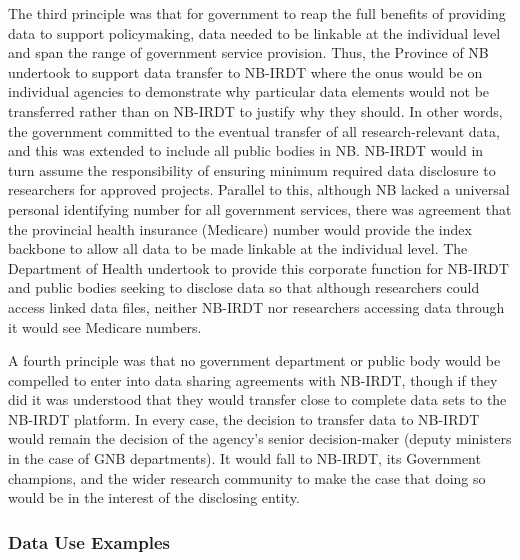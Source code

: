 \documentclass[
]{WileySix}
\begin{document}
The third principle was that for government to reap the full benefits of providing data to support policymaking, data needed to be linkable at the individual level and span the range of government service provision. Thus, the Province of NB undertook to support data transfer to NB-IRDT where the onus would be on individual agencies to demonstrate why particular data elements would not be transferred rather than on NB-IRDT to justify why they should. In other words, the government committed to the eventual transfer of all research-relevant data, and this was extended to include all public bodies in NB. NB-IRDT would in turn assume the responsibility of ensuring minimum required data disclosure to researchers for approved projects. Parallel to this, although NB lacked a universal personal identifying number for all government services, there was agreement that the provincial health insurance (Medicare) number would provide the index backbone to allow all data to be made linkable at the individual level. The Department of Health undertook to provide this corporate function for NB-IRDT and public bodies seeking to disclose data so that although researchers could access linked data files, neither NB-IRDT nor researchers accessing data through it would see Medicare numbers.

A fourth principle was that no government department or public body would be compelled to enter into data sharing agreements with NB-IRDT, though if they did it was understood that they would transfer close to complete data sets to the NB-IRDT platform. In every case, the decision to transfer data to NB-IRDT would remain the decision of the agency's senior decision-maker (deputy ministers in the case of GNB departments). It would fall to NB-IRDT, its Government champions, and the wider research community to make the case that doing so would be in the interest of the disclosing entity.

\hypertarget{data-use-examples-2}{%
\subsubsection{Data Use Examples}\label{data-use-examples-2}}
\end{document}
